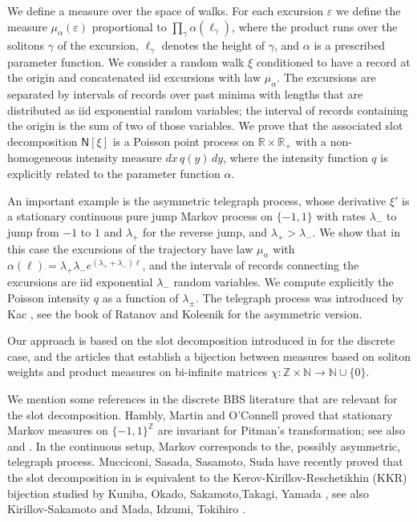 \documentclass[12pt]{article}
\numberwithin{equation}{section}
\newcommand{\NN}{\mathbb N}
\newcommand{\ZZ}{\mathbb Z}
\newcommand{\sN}{\mathsf{N}}
\newcommand{\vep}{\varepsilon}
\begin{document}
We define a measure over the space of walks.
For each excursion $\vep$ we define the measure $\mu_\alpha(\vep)$ proportional to $\prod_\gamma \alpha(\ell_\gamma)$, where the product runs over the solitons $\gamma$ of the excursion, $\ell_\gamma$ denotes the height of $\gamma$, and $\alpha$ is a prescribed parameter function.
We consider a random walk $\xi$ conditioned to have a record at the origin and concatenated iid excursions with law $\mu_\alpha$. The excursions are separated by intervals of records over past minima with lengths that are distributed as iid exponential random variables; the interval of records containing the origin is the sum of two of those variables.
We prove that the associated slot decomposition $\sN[\xi]$ is a Poisson point process on $\mathbb{R}\times\mathbb{R}_+$ with a non-homogeneous intensity measure $dx\, q(y)\,dy$, where the intensity function $q$ is explicitly related to the parameter function $\alpha$.




An important example is the asymmetric telegraph process, whose derivative $\xi'$ is a stationary continuous pure jump  Markov process on $\{-1,1\}$ with rates $\lambda_-$ to jump from $-1$ to $1$ and $\lambda_+$ for the reverse jump, and $\lambda_+>\lambda_-$. We show that in this case the excursions of the trajectory have law $\mu_{\alpha}$ with $\alpha(\ell)= \lambda_+\lambda_-e^{(\lambda_++\lambda_-)\ell}$, and the intervals of records connecting the excursions are iid exponential $\lambda_-$ random variables. We compute explicitly the Poisson intensity $q$ as a function of $\lambda_\pm$. The telegraph process was introduced by  Kac \cite{zbMATH03491985}, see the book of Ratanov and Kolesnik \cite{zbMATH07582508} for the asymmetric version.



 Our approach is based on the slot decomposition introduced in \cite{FNRW} for the discrete case, and the articles \cite{FG19,FG18} that establish a bijection between measures based on soliton weights and product measures on bi-infinite matrices $\chi:\ZZ\times \NN\to\NN\cup\{0\}$.



We mention some references in the discrete BBS literature that are relevant for the slot decomposition. Hambly, Martin and O'Connell \cite{HamblyMartinOConnell01} proved that stationary Markov measures on $\{-1,1\}^\ZZ$ are invariant for Pitman's transformation; see also
 \cite{cs-markov} and \cite{FNRW}. In the continuous setup, Markov corresponds to the, possibly asymmetric, telegraph process. 
Mucciconi, Sasada, Sasamoto, Suda \cite{mss2023} have recently proved that the slot decomposition in \cite{FNRW} is equivalent to the Kerov-Kirillov-Reschetikhin (KKR) bijection studied by  Kuniba, Okado, Sakamoto,Takagi, Yamada \cite{kosty2006}, see also Kirillov-Sakamoto \cite{KS2009} and Mada, Idzumi, Tokihiro \cite{MIT}. 
\end{document}
